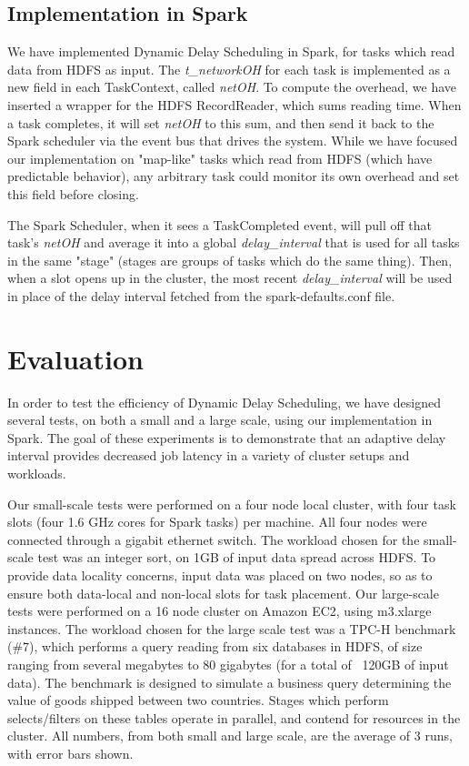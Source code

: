 \documentclass[10pt,conference,compsocconf,letterpaper]{IEEEtran}
\begin{document}
\subsection{Implementation in Spark}

We have implemented Dynamic Delay Scheduling in Spark, for tasks which read data from 
HDFS as input. The \textit{t\_networkOH} for each task is implemented as a new field in 
each TaskContext, called \textit{netOH}. To compute the overhead, we have inserted a 
wrapper for the HDFS RecordReader, which sums reading time. When a task completes, it 
will set \textit{netOH} to this sum, and then send it back to the Spark scheduler via the 
event bus that drives the system. While we have focused our implementation on "map-like" 
tasks which read from HDFS (which have predictable behavior), any arbitrary task could 
monitor its own overhead and set this field before closing.

The Spark Scheduler, when it sees a TaskCompleted event, will pull off that task's 
\textit{netOH} and average it into a global \textit{delay\_interval} that is used for all 
tasks in the same "stage" (stages are groups of tasks which do the same thing). Then, 
when a slot opens up in the cluster, the most recent \textit{delay\_interval} will be 
used in place of the delay interval fetched from the spark-defaults.conf file. 

\section{Evaluation}\label{sec:eval}

In order to test the efficiency of Dynamic Delay Scheduling, we have designed several 
tests, on both a small and a large scale, using our implementation in Spark. The goal of
these experiments is to demonstrate that an adaptive delay interval provides decreased
job latency in a variety of cluster setups and workloads.

Our small-scale tests were performed on a four node local cluster, with four task slots 
(four 1.6 GHz cores for Spark tasks) per machine. All four nodes were connected through 
a gigabit ethernet switch. The workload chosen for the small-scale test was an integer 
sort, on 1GB of input data spread across HDFS. To provide data locality concerns, 
input data was placed on two nodes, so as to ensure both data-local and non-local
slots for task placement. Our large-scale tests were performed on a 16 node cluster on 
Amazon EC2, using m3.xlarge instances. The workload chosen for the large scale test was 
a TPC-H benchmark (\#7), which performs a query reading from six databases in HDFS, of 
size ranging from several megabytes to 80 gigabytes (for a total of ~120GB of input data).
The benchmark is designed to simulate a business query determining the value of goods 
shipped between two countries. Stages which perform selects/filters on these tables 
operate in parallel, and contend for resources in the cluster. All numbers, from both 
small and large scale, are the average of 3 runs, with error bars shown.
\end{document}
